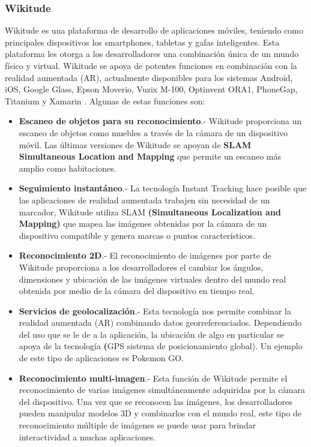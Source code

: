 \subsubsection{Wikitude}
Wikitude es una plataforma de desarrollo de aplicaciones móviles, teniendo como principales dispositivos los smartphones, tabletas y gafas inteligentes. Esta plataforma les otorga a los desarrolladores una combinación única de un mundo físico y virtual. Wikitude se apoya de potentes funciones en combinación con la realidad aumentada (AR), actualmente disponibles para los sistemas Android, iOS, Google Glass, Epson Moverio, Vuzix M-100, Optinvent ORA1, PhoneGap, Titanium y Xamarin \cite{B09}. Algunas de estas funciones son:
\begin{itemize}
	\item \textbf{Escaneo de objetos para su reconocimiento}.- Wikitude proporciona un escaneo de objetos como muebles a través de la cámara de un dispositivo móvil. Las últimas versiones de Wikitude se apoyan de \textbf{SLAM Simultaneous Location  and Mapping} que permite un escaneo más amplio como habitaciones. 
	
	\item \textbf{Seguimiento instantáneo}.- La tecnología Instant Tracking hace posible que las aplicaciones de realidad aumentada trabajen sin necesidad de un marcador, Wikitude utiliza SLAM \textbf{(Simultaneous Localization and Mapping) }que mapea las imágenes obtenidas por la cámara de un dispositivo compatible y genera marcas o puntos característicos.
	
	\item \textbf{Reconocimiento 2D}.- El reconocimiento de imágenes por parte de Wikitude proporciona a los desarrolladores el cambiar los ángulos, dimensiones y ubicación de las imágenes virtuales dentro del mundo real obtenida por medio de la cámara del dispositivo en tiempo real.
	
	\item \textbf{Servicios de geolocalización}.- Esta tecnología nos permite combinar la realidad aumentada (AR) combinando datos georreferenciados. Dependiendo del uso que se le de a la aplicación, la ubicación de algo en particular se apoya de la tecnología \textbf(GPS sistema de posicionamiento global). Un ejemplo de este tipo de aplicaciones es Pokemon GO. 
	
	\item \textbf{Reconocimiento multi-imagen}.- Esta función de Wikitude permite el reconocimiento de varias imágenes simultáneamente adquiridas por la cámara del dispositivo. Una vez que se reconocen las imágenes, los desarrolladores pueden manipular modelos 3D y combinarlos con el mundo real, este tipo de reconocimiento múltiple de imágenes se puede usar para brindar interactividad a muchas aplicaciones.
	

\end{itemize}
